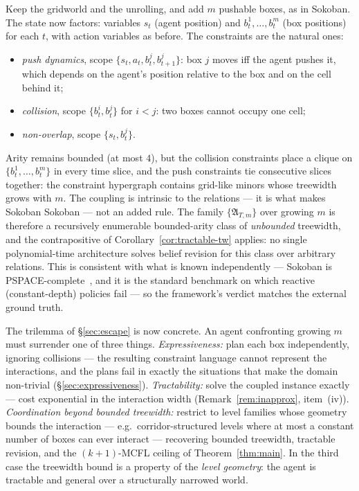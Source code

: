 \documentclass[runningheads]{llncs}
\begin{document}
\begin{example}\label{ex:sokoban}
Keep the gridworld and the unrolling, and add $m$ pushable boxes, as in Sokoban. The state now factors: variables $s_t$ (agent position) and $b^1_t, \ldots, b^m_t$ (box positions) for each $t$, with action variables as before. The constraints are the natural ones:
\begin{itemize}[nosep]
  \item \emph{push dynamics}, scope $\{s_t, a_t, b^j_t, b^j_{t+1}\}$: box $j$ moves iff the agent pushes it, which depends on the agent's position relative to the box and on the cell behind it;
  \item \emph{collision}, scope $\{b^i_t, b^j_t\}$ for $i < j$: two boxes cannot occupy one cell;
  \item \emph{non-overlap}, scope $\{s_t, b^j_t\}$.
\end{itemize}
Arity remains bounded (at most $4$), but the collision constraints place a clique on $\{b^1_t, \ldots, b^m_t\}$ in every time slice, and the push constraints tie consecutive slices together: the constraint hypergraph contains grid-like minors whose treewidth grows with $m$. The coupling is intrinsic to the relations --- it is what makes Sokoban Sokoban --- not an added rule. The family $\{\mathfrak{A}_{T,m}\}$ over growing $m$ is therefore a recursively enumerable bounded-arity class of \emph{unbounded} treewidth, and the contrapositive of Corollary~\ref{cor:tractable-tw} applies: no single polynomial-time architecture solves belief revision for this class over arbitrary relations. This is consistent with what is known independently --- Sokoban is PSPACE-complete~\cite{Culberson99}, and it is the standard benchmark on which reactive (constant-depth) policies fail --- so the framework's verdict matches the external ground truth.

The trilemma of \S\ref{sec:escape} is now concrete. An agent confronting growing $m$ must surrender one of three things. \emph{Expressiveness:} plan each box independently, ignoring collisions --- the resulting constraint language cannot represent the interactions, and the plans fail in exactly the situations that make the domain non-trivial (\S\ref{sec:expressiveness}). \emph{Tractability:} solve the coupled instance exactly --- cost exponential in the interaction width (Remark~\ref{rem:inapprox}, item~(iv)). \emph{Coordination beyond bounded treewidth:} restrict to level families whose geometry bounds the interaction --- e.g.\ corridor-structured levels where at most a constant number of boxes can ever interact --- recovering bounded treewidth, tractable revision, and the $(k{+}1)$-MCFL ceiling of Theorem~\ref{thm:main}. In the third case the treewidth bound is a property of the \emph{level geometry}: the agent is tractable and general over a structurally narrowed world.
\end{example}
\end{document}
